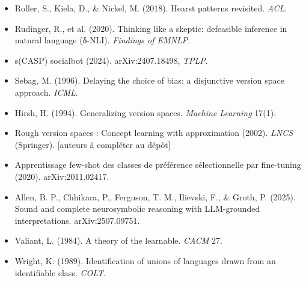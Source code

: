 \documentclass[11pt]{article}
\begin{document}
\begin{itemize}
\item Roller, S., Kiela, D., \& Nickel, M. (2018). Hearst patterns revisited. \emph{ACL}.
\item Rudinger, R., et al. (2020). Thinking like a skeptic: defeasible inference in natural language (δ-NLI). \emph{Findings of EMNLP}.
\item s(CASP) socialbot (2024). arXiv:2407.18498, \emph{TPLP}.
\item Sebag, M. (1996). Delaying the choice of bias: a disjunctive version space approach. \emph{ICML}.
\item Hirsh, H. (1994). Generalizing version spaces. \emph{Machine Learning} 17(1).
\item Rough version spaces : Concept learning with approximation (2002). \emph{LNCS} (Springer). [auteurs à compléter au dépôt]
\item Apprentissage few-shot des classes de préférence sélectionnelle par fine-tuning (2020). arXiv:2011.02417.
\item Allen, B. P., Chhikara, P., Ferguson, T. M., Ilievski, F., \& Groth, P. (2025). Sound and complete neurosymbolic reasoning with LLM-grounded interpretations. arXiv:2507.09751.
\item Valiant, L. (1984). A theory of the learnable. \emph{CACM} 27.
\item Wright, K. (1989). Identification of unions of languages drawn from an identifiable class. \emph{COLT}.

\end{itemize}
\end{document}
